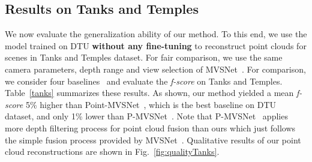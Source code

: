 \subsection{Results on Tanks and Temples}
\vspace{-0.1cm}
We now evaluate the generalization ability of our method. To this end, we use the model trained on DTU \textbf{without any fine-tuning} to reconstruct point clouds for scenes in Tanks and Temples dataset. For fair comparison, we use the same camera parameters, depth range and view selection of MVSNet~\cite{yao2018mvsnet}. For comparison, we consider four baselines~\cite{chen2019point,luo2019p,yao2018mvsnet,yao2019recurrent} and evaluate the \textit{f-score} on Tanks and Temples. Table~\ref{tanks} summarizes these results. As shown, our method yielded a mean \textit{f-score} 5\% higher than Point-MVSNet~\cite{chen2019point}, which is the best baseline on DTU dataset, and only 1\% lower than P-MVSNet~\cite{luo2019p}. Note that P-MVSNet~\cite{luo2019p} applies more depth filtering process for point cloud fusion than ours which just follows the simple fusion process provided by MVSNet~\cite{yao2018mvsnet}. Qualitative results of our point cloud reconstructions are shown in Fig.~\ref{fig:qualityTanks}. 

